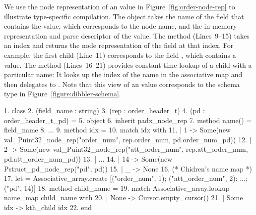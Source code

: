 We use the node representation of an 
value in Figure~\ref{fig:order-node-rep} to illustrate type-specific
compilation.  The object takes the name of the field that contains the
 value, which corresponds to the \Xml{} node
name, and the in-memory representation and parse descriptor of the
value.  The  method (Lines~9--15) takes an index and
returns the node representation of the field at that index.  For
example, the first child (Line~11) corresponds to the field
, which contains a  value.  The
 method (Lines~16--21) provides constant-time
lookup of a child with a particular name: It looks up the index of the
name in the associative map  and then delegates
to .  Note that this \Xml{} view of an
 value corresponds to the schema type
 in Figure~\ref{figure:dibbler-schema}.
\begin{figure*}
\begin{small}
\begin{code}
{ 1}. class 
{ 2}.       (field\_name : string)
{ 3}.       (rep : order\_header\_t)
{ 4}.       (pd  : order\_header\_t\_pd) = 
{ 5}. object 
{ 6}.   inherit padx\_node\_rep
{ 7}.   method name() = field\_name
{ 8}.   ... 
{ 9}.   method  idx = 
{10}.     match idx with 
{11}.     |  1 -> Some(new val\_Puint32\_node\_rep("order\_num", rep.order\_num, pd.order\_num\_pd))
{12}.     |  2 -> Some(new val\_Puint32\_node\_rep("att\_order\_num", rep.att\_order\_num, pd.att\_order\_num\_pd))
{13}.     | ...
{14}.     | 14 -> Some(new Pstruct\_pd\_node\_rep("pd", pd))
{15}.     | _  -> None
\mbox{}
{16}.   (* Chidren's name map *)
{17}.   let  = Associative\_array.create [("order\_num", 1); ("att\_order\_num", 2); ...; ("pd", 14)] 
{18}.   method  child\_name =
{19}.     match Associative\_array.lookup name\_map child\_name with
{20}.     | None -> Cursor.empty_cursor()
{21}.     | Some idx -> kth_child idx 
{22}. end
\end{code}
\end{small}
\caption{Fragment of compiler-generated node representation for \texttt{order\_header\_t}}
\label{fig:order-node-rep}
\end{figure*}

